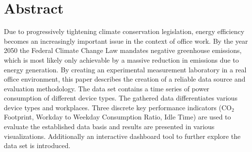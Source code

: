 \chapter*{Abstract}
Due to progressively tightening climate conservation legislation, energy efficiency becomes an increasingly important issue in the context of office work. By the year 2050 the Federal Climate Change Law mandates negative greenhouse emissions, which is most likely only achievable by a massive reduction in emissions due to energy generation. By creating an experimental measurement laboratory in a real office environment, this paper describes the creation of a reliable data source and evaluation methodology. The data set contains a time series of power consumption of different device types. The gathered data differentiates various device types and workplaces. Three discrete key performance indicators (CO$_2$ Footprint, Workday to Weekday Consumption Ratio, Idle Time) are used to evaluate the established data basis and results are presented in various visualizations. Additionally an interactive dashboard tool to further explore the data set is introduced.